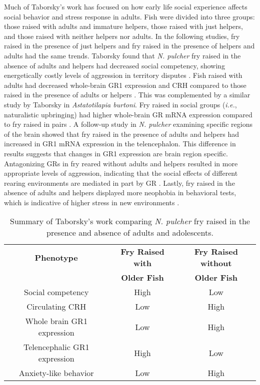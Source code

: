 \documentclass[12pt,twoside]{reedthesis}
\begin{document}
Much of Taborsky's work has focused on
how early life social experience affects social behavior and stress response in
adults. Fish were divided into three groups: those raised with adults and
immature helpers, those raised with just helpers, and those raised with neither
helpers nor adults. In the following studies, fry raised in the presence of just
helpers and fry raised in the presence of helpers and adults had the same
trends. Taborsky found that \textit{N. pulcher} fry raised in the
absence of adults and helpers had decreased social competency, showing
energetically costly levels of aggression in territory disputes \citep{arnold_social_2010}. Fish raised with adults had decreased whole-brain GR1
expression and CRH compared to those raised in the presence of adults or helpers
\citep{taborsky_stable_2012}.  This was complemented by a similar study by Taborsky in \textit{Astatotilapia burtoni}. Fry raised
in social groups (\textit{i.e.}, naturalistic upbringing) had higher
whole-brain GR mRNA expression compared to fry raised in pairs \citep{solomon-lane_early-life_2018}. 
A follow-up study in \textit{N. pulcher} examining specific regions of the brain
showed that fry raised in the presence of adults and helpers had increased in
GR1 mRNA expression in the telencephalon. This difference in results suggests
that changes in GR1 expression are brain region specific. Antagonizing GRs in fry reared without adults and helpers resulted in more appropriate
levels of aggression, indicating that the social effects of different rearing
environments are mediated in part by GR \citep{nyman_effect_2017}. Lastly, fry raised in
the absence of adults and helpers displayed more neophobia in behavioral tests,
which is indicative of higher stress in new environments \citep{bannier_early_2017}. 

\begin{table}[htbp]
\caption[Summary of Taborsky's work comparing \textit{N. pulcher} fry raised in the presence and absence
of adults and adolescents]{Summary of Taborsky's work comparing \textit{N. pulcher} fry raised in the presence and absence
of adults and adolescents.}
\begin{center}
\footnotesize
\begin{tabular}{ | c | c | c | }
  \hline
  \textbf{Phenotype} & \textbf{Fry Raised with} & \textbf{Fry Raised without} \\
  & \textbf{Older Fish} & \textbf{Older Fish} \\
\hline
  Social competency & High & Low\\
\hline
  Circulating CRH & Low & High\\
\hline
  Whole brain GR1 expression & Low & High\\
\hline
  Telencephalic GR1 expression & High & Low\\
\hline
  Anxiety-like behavior & Low & High\\
\hline
\end{tabular}
\end{center}
\end{table}
\end{document}
